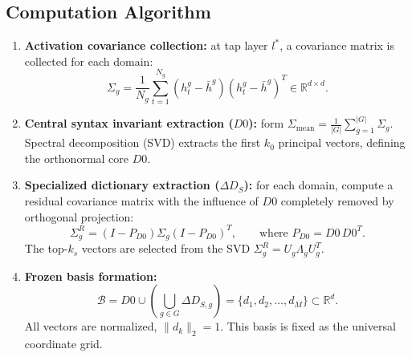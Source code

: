 \documentclass[11pt,a4paper]{article}
\begin{document}
\subsection*{Computation Algorithm}
\begin{enumerate}
\item \textbf{Activation covariance collection:} at tap layer $l^*$, a covariance matrix is collected for each domain:
\begin{equation}\Sigma_g=\frac1{N_g}\sum_{t=1}^{N_g}(h_t^g-\bar h^g)(h_t^g-\bar h^g)^T\in\mathbb R^{d\times d}.\end{equation}
\item \textbf{Central syntax invariant extraction ($D0$):} form $\Sigma_{\text{mean}}=\frac1{|G|}\sum_{g=1}^{|G|}\Sigma_g$. Spectral decomposition (SVD) extracts the first $k_0$ principal vectors, defining the orthonormal core $D0$.
\item \textbf{Specialized dictionary extraction ($\Delta D_S$):} for each domain, compute a residual covariance matrix with the influence of $D0$ completely removed by orthogonal projection:
\begin{equation}\Sigma_g^R=(I-P_{D0})\Sigma_g(I-P_{D0})^T,\qquad \text{where }P_{D0}=D0\,D0^T.\end{equation}
The top-$k_s$ vectors are selected from the SVD $\Sigma_g^R=U_g\Lambda_gU_g^T$.
\item \textbf{Frozen basis formation:}
\begin{equation}\mathcal B=D0\cup\left(\bigcup_{g\in G}\Delta D_{S,g}\right)=\{d_1,d_2,\dots,d_M\}\subset\mathbb R^d.\end{equation}
All vectors are normalized, $\|d_k\|_2=1$. This basis is fixed as the universal coordinate grid.
\end{enumerate}
\end{document}
